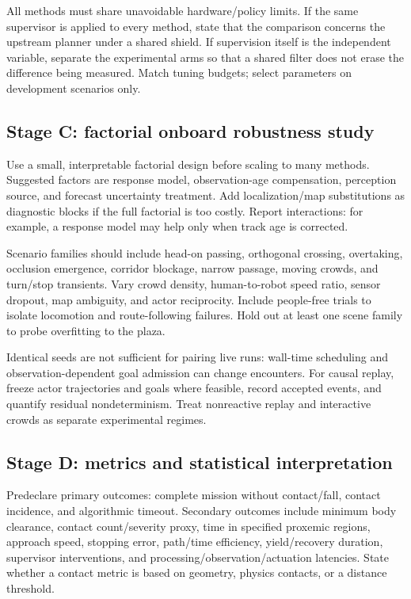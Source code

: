 \documentclass[11pt,a4paper]{article}
\begin{document}
All methods must share unavoidable hardware/policy limits. If the same
supervisor is applied to every method, state that the comparison concerns
the upstream planner under a shared shield. If supervision itself is the
independent variable, separate the experimental arms so that a shared
filter does not erase the difference being measured. Match tuning budgets;
select parameters on development scenarios only.

\subsection{Stage C: factorial onboard robustness study}
Use a small, interpretable factorial design before scaling to many methods.
Suggested factors are response model, observation-age compensation,
perception source, and forecast uncertainty treatment. Add localization/map
substitutions as diagnostic blocks if the full factorial is too costly.
Report interactions: for example, a response model may help only when
track age is corrected.

Scenario families should include head-on passing, orthogonal crossing,
overtaking, occlusion emergence, corridor blockage, narrow passage, moving
crowds, and turn/stop transients. Vary crowd density, human-to-robot speed
ratio, sensor dropout, map ambiguity, and actor reciprocity. Include
people-free trials to isolate locomotion and route-following failures.
Hold out at least one scene family to probe overfitting to the plaza.

Identical seeds are not sufficient for pairing live runs: wall-time
scheduling and observation-dependent goal admission can change encounters.
For causal replay, freeze actor trajectories and goals where feasible,
record accepted events, and quantify residual nondeterminism. Treat
nonreactive replay and interactive crowds as separate experimental regimes.

\subsection{Stage D: metrics and statistical interpretation}
Predeclare primary outcomes: complete mission without contact/fall, contact
incidence, and algorithmic timeout. Secondary outcomes include minimum
body clearance, contact count/severity proxy, time in specified proxemic
regions, approach speed, stopping error, path/time efficiency, yield/recovery
duration, supervisor interventions, and processing/observation/actuation
latencies. State whether a contact metric is based on geometry, physics
contacts, or a distance threshold.
\end{document}

